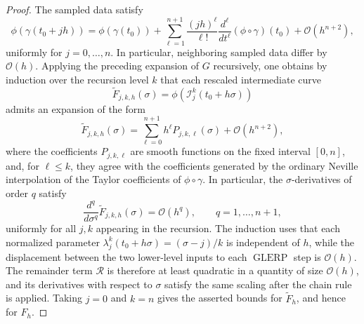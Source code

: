 \documentclass[10pt,a4paper]{amsart}
\newcommand{\GLERP}{\operatorname{GLERP}}
\begin{document}
\begin{proof}
The sampled data satisfy
\[
    \phi(\gamma(t_0+jh))
    =
    \phi(\gamma(t_0))
    +
    \sum_{\ell=1}^{n+1}
    \frac{(jh)^\ell}{\ell!}
    \frac{d^\ell}{dt^\ell}(\phi\circ\gamma)(t_0)
    +
    \mathcal{O}(h^{n+2}),
\]
uniformly for \(j=0,\ldots,n\).  In particular, neighboring sampled data differ by \(\mathcal{O}(h)\).  Applying the preceding expansion of \(G\) recursively, one obtains by induction over the recursion level \(k\) that each rescaled intermediate curve
\[
    \widetilde F_{j,k,h}(\sigma)
    =
    \phi\left(\mathcal{I}_j^k(t_0+h\sigma)\right)
\]
admits an expansion of the form
\[
    \widetilde F_{j,k,h}(\sigma)
    =
    \sum_{\ell=0}^{n+1}
    h^\ell P_{j,k,\ell}(\sigma)
    +
    \mathcal{O}(h^{n+2}),
\]
where the coefficients \(P_{j,k,\ell}\) are smooth functions on the fixed interval \([0,n]\), and, for \(\ell\le k\), they agree with the coefficients generated by the ordinary Neville interpolation of the Taylor coefficients of \(\phi\circ\gamma\).  In particular, the \(\sigma\)-derivatives of order \(q\) satisfy
\[
    \frac{d^q}{d\sigma^q}\widetilde F_{j,k,h}(\sigma)=\mathcal{O}(h^q),
    \qquad q=1,\ldots,n+1,
\]
uniformly for all \(j,k\) appearing in the recursion.  The induction uses that each normalized parameter \(\lambda_j^k(t_0+h\sigma)=(\sigma-j)/k\) is independent of \(h\), while the displacement between the two lower-level inputs to each \(\GLERP\) step is \(\mathcal{O}(h)\).  The remainder term \(\mathcal{R}\) is therefore at least quadratic in a quantity of size \(\mathcal{O}(h)\), and its derivatives with respect to \(\sigma\) satisfy the same scaling after the chain rule is applied.  Taking \(j=0\) and \(k=n\) gives the asserted bounds for \(\widetilde F_h\), and hence for \(F_h\).
\end{proof}
\end{document}
